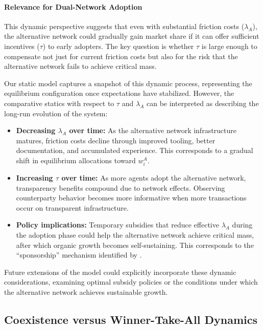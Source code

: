 \paragraph{Relevance for Dual-Network Adoption}

This dynamic perspective suggests that even with substantial friction costs ($\lambda_A$), the alternative network could gradually gain market share if it can offer sufficient incentives ($\tau$) to early adopters. The key question is whether $\tau$ is large enough to compensate not just for current friction costs but also for the risk that the alternative network fails to achieve critical mass.

Our static model captures a snapshot of this dynamic process, representing the equilibrium configuration once expectations have stabilized. However, the comparative statics with respect to $\tau$ and $\lambda_A$ can be interpreted as describing the long-run evolution of the system:

\begin{itemize}
    \item \textbf{Decreasing $\lambda_A$ over time:} As the alternative network infrastructure matures, friction costs decline through improved tooling, better documentation, and accumulated experience. This corresponds to a gradual shift in equilibrium allocations toward $w_i^A$.
    
    \item \textbf{Increasing $\tau$ over time:} As more agents adopt the alternative network, transparency benefits compound due to network effects. Observing counterparty behavior becomes more informative when more transactions occur on transparent infrastructure.
    
    \item \textbf{Policy implications:} Temporary subsidies that reduce effective $\lambda_A$ during the adoption phase could help the alternative network achieve critical mass, after which organic growth becomes self-sustaining. This corresponds to the ``sponsorship'' mechanism identified by .
\end{itemize}

Future extensions of the model could explicitly incorporate these dynamic considerations, examining optimal subsidy policies or the conditions under which the alternative network achieves sustainable growth.

\subsection{Coexistence versus Winner-Take-All Dynamics}

